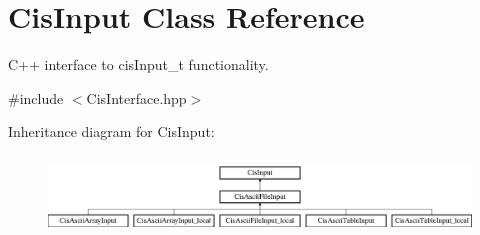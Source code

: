 \hypertarget{classCisInput}{}\section{Cis\+Input Class Reference}
\label{classCisInput}


C++ interface to cis\+Input\+\_\+t functionality.  




{\ttfamily \#include $<$Cis\+Interface.\+hpp$>$}

Inheritance diagram for Cis\+Input\+:\begin{figure}[H]
\begin{center}
\leavevmode
\includegraphics[height=2.100000cm]{classCisInput}
\end{center}
\end{figure}
